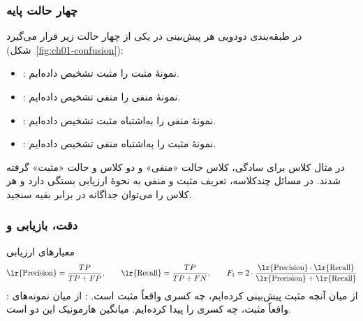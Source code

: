 \subsubsection{چهار حالت پایه}
در طبقه‌بندی دودویی هر پیش‌بینی در یکی از چهار حالت زیر قرار می‌گیرد (شکل~\ref{fig:ch01-confusion}):
\begin{itemize}
  \item {}: نمونهٔ مثبت را مثبت تشخیص داده‌ایم.
  \item {}: نمونهٔ منفی را منفی تشخیص داده‌ایم.
  \item {}: نمونهٔ منفی را به‌اشتباه مثبت تشخیص داده‌ایم.
  \item {}: نمونهٔ مثبت را به‌اشتباه منفی تشخیص داده‌ایم.
\end{itemize}


در مثال کلاس برای سادگی، کلاس  حالت «منفی» و دو کلاس  و  حالت «مثبت» گرفته شدند. در مسائل چندکلاسه، تعریف مثبت و منفی به نحوهٔ ارزیابی بستگی دارد و هر کلاس را می‌توان جداگانه در برابر بقیه سنجید.

\subsubsection{دقت، بازیابی و }
\begin{definitionbox}{معیارهای ارزیابی}
\[
\text{\lr{Precision}}=\frac{TP}{TP+FP},\qquad
\text{\lr{Recall}}=\frac{TP}{TP+FN},\qquad
F_1=2\cdot\frac{\text{\lr{Precision}}\cdot\text{\lr{Recall}}}{\text{\lr{Precision}}+\text{\lr{Recall}}}
\]
: از میان آنچه مثبت پیش‌بینی کرده‌ایم، چه کسری واقعاً مثبت است. : از میان نمونه‌های واقعاً مثبت، چه کسری را پیدا کرده‌ایم.  میانگین هارمونیک این دو است.
\end{definitionbox}

